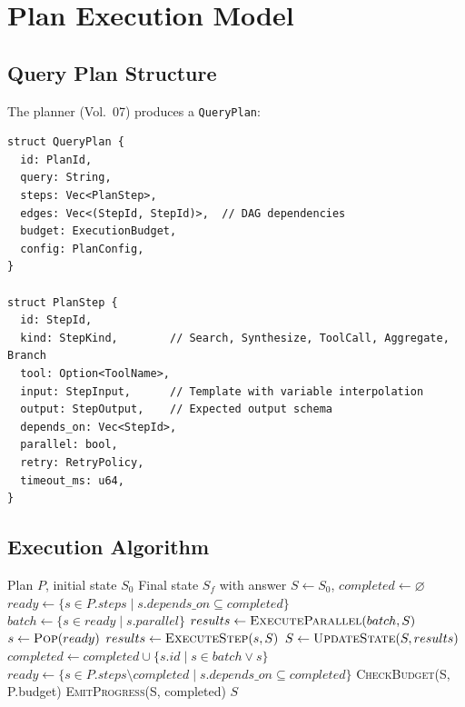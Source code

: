 \section{Plan Execution Model}
\label{sec:runtime:plan-exec}

\subsection{Query Plan Structure}
\label{sec:runtime:plan-structure}

The planner (Vol.~07) produces a \texttt{QueryPlan}:

\begin{verbatim}
struct QueryPlan {
  id: PlanId,
  query: String,
  steps: Vec<PlanStep>,
  edges: Vec<(StepId, StepId)>,  // DAG dependencies
  budget: ExecutionBudget,
  config: PlanConfig,
}

struct PlanStep {
  id: StepId,
  kind: StepKind,        // Search, Synthesize, ToolCall, Aggregate, Branch
  tool: Option<ToolName>,
  input: StepInput,      // Template with variable interpolation
  output: StepOutput,    // Expected output schema
  depends_on: Vec<StepId>,
  parallel: bool,
  retry: RetryPolicy,
  timeout_ms: u64,
}
\end{verbatim}

\subsection{Execution Algorithm}
\label{sec:runtime:exec-algo}

\begin{algorithm}[H]
\caption{Plan Execution}
\label{alg:plan-exec}
\begin{algorithmic}[1]
\Require Plan $P$, initial state $S_0$
\Ensure Final state $S_f$ with answer
\State $S \gets S_0$, $completed \gets \varnothing$
\State $ready \gets \{ s \in P.steps \mid s.depends\_on \subseteq completed \}$
    \State $batch \gets \{ s \in ready \mid s.parallel \}$
    \State $results \gets \textsc{ExecuteParallel}(batch, S)$
  \Else
    \State $s \gets \textsc{Pop}(ready)$
    \State $results \gets \textsc{ExecuteStep}(s, S)$
  \EndIf
  \State $S \gets \textsc{UpdateState}(S, results)$
  \State $completed \gets completed \cup \{s.id \mid s \in batch \lor s\}$
  \State $ready \gets \{ s \in P.steps \setminus completed \mid s.depends\_on \subseteq completed \}$
  \State \textsc{CheckBudget}(S, P.budget) 
  \State \textsc{EmitProgress}(S, completed) 
\EndWhile
\State \Return $S$
\end{algorithmic}
\end{algorithm}

